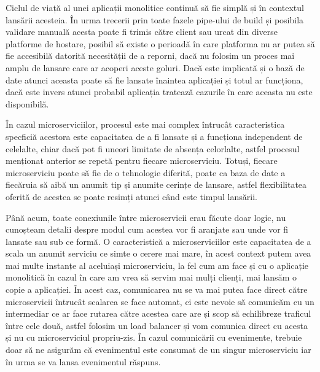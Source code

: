 Ciclul de viață al unei aplicații monolitice continuă să fie simplă și în contextul
lansării acesteia. În urma trecerii prin toate fazele pipe-ului de build și posibila
validare manuală acesta poate fi trimis către client sau urcat din diverse platforme
de hostare, posibil să existe o perioadă în care platforma nu ar putea să fie accesibilă
datorită necesității de a reporni, dacă nu folosim un proces mai amplu de lansare 
care ar acoperi aceste goluri. Dacă este implicată și o bază de date atunci aceasta poate 
să fie lansate înaintea aplicației și totul ar funcționa, dacă este invers atunci probabil
aplicația tratează cazurile în care aceasta nu este disponibilă.

În cazul microserviciilor, procesul este mai complex întrucât caracteristica specficiă 
acestora este capacitatea de a fi lansate și a funcționa independent de celelalte, chiar
dacă pot fi uneori limitate de absența celorlalte, astfel procesul menționat anterior 
se repetă pentru fiecare microserviciu. Totuși, fiecare microserviciu poate să fie de o tehnologie
diferită, poate ca baza de date a fiecăruia să aibă un anumit tip și anumite cerințe de lansare,
astfel flexibilitatea oferită de acestea se poate resimți atunci când este timpul lansării.

Până acum, toate conexiunile între microservicii erau făcute doar logic, nu cunoșteam 
detalii despre modul cum acestea vor fi aranjate sau unde vor fi lansate sau sub ce formă.
O caracteristică a microserviciilor este capacitatea de a scala un anumit serviciu ce simte
o cerere mai mare, în acest context putem avea mai multe instanțe al aceluiași microserviciu,
la fel cum am face și cu o aplicație monolitică în cazul în care am vrea să servim mai mulți
clienți, mai lansăm o copie a aplicației. În acest caz, comunicarea nu se va mai putea 
face direct către microservicii întrucât scalarea se face automat, ci este nevoie să comunicăm
cu un intermediar ce ar face rutarea către acestea care are și scop să echilibreze
traficul între cele două, astfel folosim un load balancer și vom comunica direct cu acesta 
și nu cu microserviciul propriu-zis. În cazul comunicării cu evenimente, trebuie doar să 
ne asigurăm că evenimentul este consumat de un singur microserviciu iar în urma se va 
lansa evenimentul răspuns.


